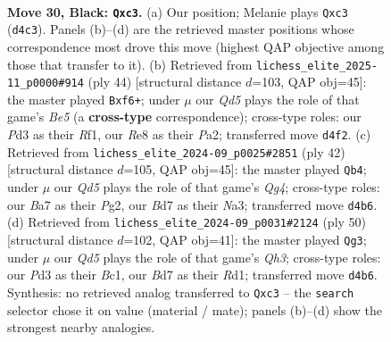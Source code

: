 \documentclass[11pt]{article}
\begin{document}
\clearpage

\begin{figure}[p]\centering
\begin{subfigure}{0.46\textwidth}\centering
\resizebox{\linewidth}{!}{%
\newchessgame
\chessboard[
  setfen={r3r2k/bp1b1pp1/p3p3/7P/3q4/BPPp1Q1B/P4PKP/R3R3 b - - 0 30},
  showmover=false,
  pgfstyle=straightmove, color=movearrow, markmove={d4-c3}
]}
\caption{}
\end{subfigure}\hfill
\begin{subfigure}{0.46\textwidth}\centering
\resizebox{\linewidth}{!}{%
\newchessgame
\chessboard[
  setfen={r6r/ppp3k1/5p1p/2bPB1pb/2P1R3/5P1q/PPB1Q2P/5R1K w - - 0 23},
  showmover=false,
  pgfstyle=straightmove, color=movearrow, markmove={e5-f6}
]}
\caption{}
\end{subfigure}
\\[4pt]
\begin{subfigure}{0.46\textwidth}\centering
\resizebox{\linewidth}{!}{%
\newchessgame
\chessboard[
  setfen={3r2k1/pp2prb1/q5p1/7p/P5Q1/N1PbB2P/1P3PP1/2R1K2R w K - 0 22},
  showmover=false,
  pgfstyle=straightmove, color=movearrow, markmove={g4-b4}
]}
\caption{}
\end{subfigure}\hfill
\begin{subfigure}{0.46\textwidth}\centering
\resizebox{\linewidth}{!}{%
\newchessgame
\chessboard[
  setfen={1r1q1k2/1bp1bp1r/4p3/p6p/3P2p1/2PB3Q/P4PPP/2BRR1K1 w - - 0 26},
  showmover=false,
  pgfstyle=straightmove, color=movearrow, markmove={h3-g3}
]}
\caption{}
\end{subfigure}
\caption{\textbf{Move 30, Black: \texttt{Qxc3}.} (a) Our position; Melanie plays \texttt{Qxc3} (\texttt{d4c3}). Panels (b)--(d) are the retrieved master positions whose correspondence most drove this move (highest QAP objective among those that transfer to it). (b) Retrieved from \texttt{lichess\_elite\_2025-11\_p0000\#914} (ply 44) [structural distance $d$=103, QAP obj=45]: the master played \texttt{Bxf6+}; under $\mu$ our \emph{Qd5} plays the role of that game's \emph{Be5} (a \textbf{cross-type} correspondence); cross-type roles: our \emph{P}d3 as their \emph{R}f1, our \emph{R}e8 as their \emph{P}a2; transferred move \texttt{d4f2}. (c) Retrieved from \texttt{lichess\_elite\_2024-09\_p0025\#2851} (ply 42) [structural distance $d$=105, QAP obj=45]: the master played \texttt{Qb4}; under $\mu$ our \emph{Qd5} plays the role of that game's \emph{Qg4}; cross-type roles: our \emph{B}a7 as their \emph{P}g2, our \emph{B}d7 as their \emph{N}a3; transferred move \texttt{d4b6}. (d) Retrieved from \texttt{lichess\_elite\_2024-09\_p0031\#2124} (ply 50) [structural distance $d$=102, QAP obj=41]: the master played \texttt{Qg3}; under $\mu$ our \emph{Qd5} plays the role of that game's \emph{Qh3}; cross-type roles: our \emph{P}d3 as their \emph{B}c1, our \emph{B}d7 as their \emph{R}d1; transferred move \texttt{d4b6}. Synthesis: no retrieved analog transferred to \texttt{Qxc3} -- the \texttt{search} selector chose it on value (material / mate); panels (b)--(d) show the strongest nearby analogies.}
\label{fig:thought-m59}
\end{figure}
\end{document}
